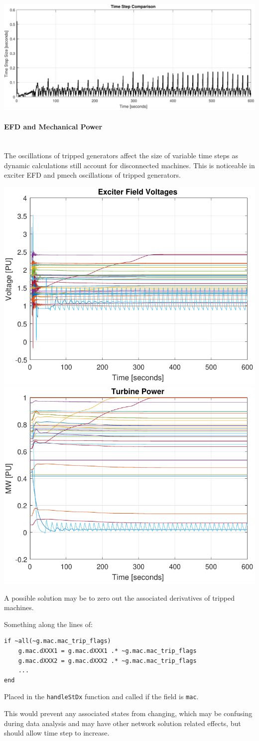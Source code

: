 \documentclass[12pt]{article}
\begin{document}
\includegraphics[width=\linewidth]{genTripteps01}

\pagebreak
\paragraph{EFD and Mechanical Power} \ \\
The oscillations of tripped generators affect the size of variable time steps as dynamic calculations still account for disconnected machines.
This is noticeable in exciter EFD and pmech oscillations of tripped generators.

\begin{center}
\includegraphics[width=.5\linewidth]{genTripEFD01}%
\includegraphics[width=.5\linewidth]{genTripPOW01}
\end{center}

A possible solution may be to zero out the associated derivatives of tripped machines.

Something along the lines of:
\begin{verbatim}
if ~all(~g.mac.mac_trip_flags)
	g.mac.dXXX1 = g.mac.dXXX1 .* ~g.mac.mac_trip_flags
	g.mac.dXXX2 = g.mac.dXXX2 .* ~g.mac.mac_trip_flags
	...
end
\end{verbatim}

Placed in the \verb|handleStDx| function and called if the field is \verb|mac|.


This would prevent any associated states from changing, which may be confusing during data analysis and may have other network solution related effects, but should allow time step to increase.
\end{document}
